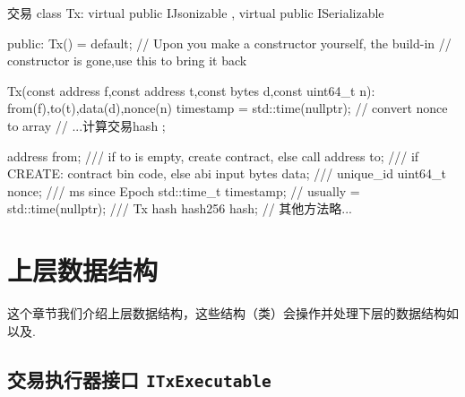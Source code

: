 \begin{numberedc}{交易}{\label{code:tx}}
 class Tx: virtual public IJsonizable
        , virtual public ISerializable{
public:
  Tx() = default; // Upon you make a constructor yourself, the build-in
  // constructor is gone,use this to bring it back

  Tx(const address f,const address t,const bytes d,const uint64_t n):
    from(f),to(t),data(d),nonce(n){
    timestamp = std::time(nullptr);
    // convert nonce to array
    // ...计算交易hash
  };

  address from;
  /// if to is empty, create contract, else call
  address  to;
  /// if CREATE: contract bin code, else abi input
  bytes data;
  /// unique_id
  uint64_t nonce;
  /// ms since Epoch
  std::time_t timestamp;
  // usually = std::time(nullptr);
  /// Tx hash
  hash256 hash;
  // 其他方法略...
}
\end{numberedc}

\section{上层数据结构}
\label{sec:upper-data-sec}

这个章节我们介绍上层数据结构，这些结构（类）会操作并处理下层的数据结构如以及.

\subsection{交易执行器接口 \texttt{ITxExecutable}}
\label{sec:ITxExecutable}

